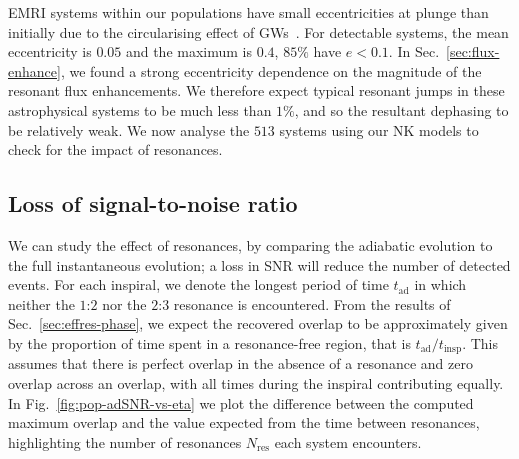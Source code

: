\documentclass[aps,prd,amsfonts,amssymb,amsmath,nofootinbib,showpacs,superscriptaddress,twocolumn,floatfix]{revtex4-1}
\newcommand{\figref}[1]{Fig.~\ref{fig:#1}}
\newcommand{\secref}[1]{Sec.~\ref{sec:#1}}
\newcommand{\sub}[1]{\ensuremath{_\mathrm{#1}}}
\begin{document}
EMRI systems within our populations have small eccentricities at plunge than initially due to the circularising effect of GWs~\cite{Peters1964}. For detectable systems, the mean eccentricity is $0.05$ and the maximum is $0.4$, $85\%$ have $e < 0.1$. In \secref{flux-enhance}, we found a strong eccentricity dependence on the magnitude of the resonant flux enhancements. We therefore expect typical resonant jumps in these astrophysical systems to be much less than $1\%$, and so the resultant dephasing to be relatively weak. We now analyse the $513$ systems using our NK models to check for the impact of resonances.

\subsection{Loss of signal-to-noise ratio}
\label{sec:population-SNR}

We can study the effect of resonances, by comparing the adiabatic evolution to the full instantaneous evolution; a loss in SNR will reduce the number of detected events. For each inspiral, we denote the longest period of time $t\sub{ad}$ in which neither the $1$:$2$ nor the $2$:$3$ resonance is encountered. From the results of \secref{effres-phase}, we expect the recovered overlap to be approximately given by the proportion of time spent in a resonance-free region, that is $t\sub{ad} / t\sub{insp}$. This assumes that there is perfect overlap in the absence of a resonance and zero overlap across an overlap, with all times during the inspiral contributing equally. 
In \figref{pop-adSNR-vs-eta} we plot the difference between the computed maximum overlap and the value expected from the time between resonances, highlighting the number of resonances $N\sub{res}$ each system encounters.
\end{document}
